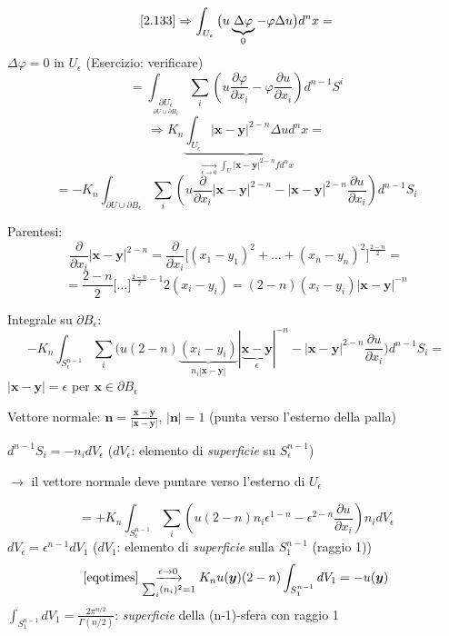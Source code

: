 \documentclass[a4paper,11pt]{report}
\newcommand{\vect}[1]{\boldsymbol{#1}}
\newcommand{\x}{\boldsymbol{x}}
\newcommand{\y}{\boldsymbol{y}}
\begin{document}
\[
\eqref{2.133} \Rightarrow \int_{U_\epsilon} \big(u \underbrace{\Delta\varphi}_{0} - \varphi \Delta u\big)d^n x=
\]
$\Delta \varphi = 0$ in $U_\epsilon$ (Esercizio: verificare)
\[
=\int_{\underset{\partial U \cup \partial B_\epsilon }{ \partial U_\epsilon}} \sum_i \left( u\frac{\partial \varphi}{\partial x_i} - \varphi \frac{\partial u}{\partial x_i}\right)d^{n-1}S^i
\]
\[
\Rightarrow K_n \underbrace{\int_{U_\epsilon}|\x-\y|^{2-n} \Delta u d^n x}_{\underset{\epsilon \to 0}{\longrightarrow}\int_U |\x - \y|^{2-n}f d^n x}=
\]
\begin{equation}
=-K_n \int_{\partial U \cup \partial B_\epsilon}\sum_i \left(u\frac{\partial}{\partial x_i}|\x-\y|^{2-n} - |\x-\y|^{2-n}\frac{\partial u}{\partial x_i} \right)d^{n-1}S_i
\label{2.134}
\end{equation}

\medskip

Parentesi:
\[
\frac{\partial}{\partial x_i}|\x - \y|^{2-n}=\frac{\partial}{\partial x_i}\big[ (x_1-y_1)^2 + \ldots + (x_n - y_n)^2\big]^{\frac{2-n}{2}}=
\]
\[
=\frac{2-n}{2} \big[\ldots \big]^{\frac{2-n}{2}-1} 2(x_i-y_i)=(2-n)(x_i-y_i)|\x-\y|^{-n}
\]

\medskip

Integrale su $\partial B_\epsilon$:
\[
-K_n\int_{S^{n-1}_\epsilon}\sum_i\Big(u(2-n) \underbrace{(x_i-y_i)}_{n_i |\x - \y|} |\underbrace{\x - \y}_{\epsilon}|^{-n}-|\x-\y|^{2-n}\frac{\partial u}{\partial x_i}\Big) d^{n-1}S_i=
\]
$|\x-\y|=\epsilon$ per $\x \in \partial B_\epsilon$

Vettore normale: $\vect{n}=\frac{\x - \y}{|\x-\y|}$, $|\vect{n}|=1$ (punta verso l'esterno della palla)


$d^{n-1}S_i= - n_i dV_\epsilon$ ($dV_\epsilon$: elemento di \emph{superficie} su $S^{n-1}_\epsilon$)

$\rightarrow$ il vettore normale deve puntare verso l'esterno di $U_\epsilon$


\begin{equation}
=+K_n\int_{S_\epsilon^{n-1}} \sum_i \left(u(2-n)n_i\epsilon^{1-n}-\epsilon^{2-n}\frac{\partial u}{\partial x_i}\right)n_i dV_\epsilon
\tag{$\otimes$}
\label{eqotimes}
\end{equation}
$dV_\epsilon = \epsilon^{n-1}dV_1$ ($dV_1$: elemento di \emph{superficie} sulla $S_1^{n-1}$ (raggio 1))
\begin{equation}
\eqref{eqotimes} \underset{\sum_i (n_i)^2=1}{\xrightarrow{\epsilon \to 0} } K_n u(\y)(2-n)\int_{S_1^{n-1}}dV_1=-u(\y)
\label{2.135}
\end{equation}
$\int_{S_1^{n-1}}dV_1=\frac{2\pi^{n/2}}{\Gamma(n/2)}$: \emph{superficie} della (n-1)-sfera con raggio 1
\end{document}
